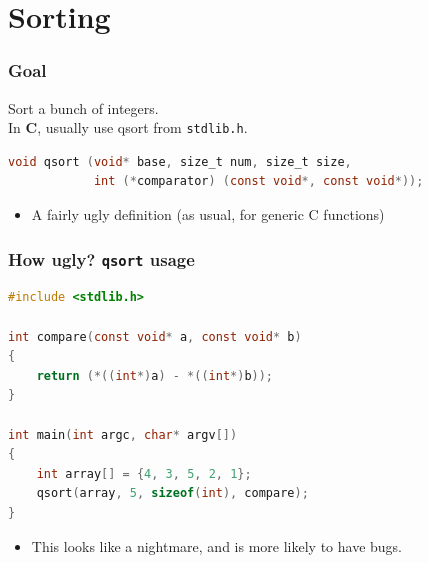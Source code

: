\section{Sorting}
\begin{frame}[fragile]
  \frametitle{Goal}


  
  Sort a bunch of integers.\\[1em]
  In {\bf C}, usually use qsort from {\tt stdlib.h}.

  \begin{lstlisting}[language=C]
void qsort (void* base, size_t num, size_t size,
            int (*comparator) (const void*, const void*));
  \end{lstlisting}

  \begin{itemize}
    \item A fairly ugly definition (as usual, for generic C functions)
  \end{itemize}
  
\end{frame}

\begin{frame}[fragile]
  \frametitle{How ugly? {\tt qsort} usage}

  
  \begin{lstlisting}[language=C]
#include <stdlib.h>

int compare(const void* a, const void* b)
{
    return (*((int*)a) - *((int*)b));
}

int main(int argc, char* argv[])
{
    int array[] = {4, 3, 5, 2, 1};
    qsort(array, 5, sizeof(int), compare);
}
  \end{lstlisting}

  \begin{itemize}
    \item This looks like a nightmare, and is more likely to have bugs.
  \end{itemize}
  
\end{frame}

